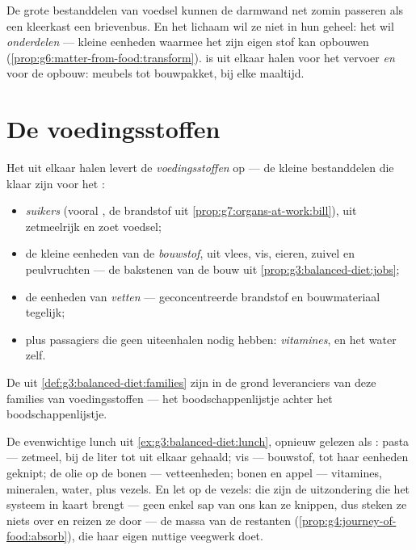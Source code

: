 \begin{remark}\label{rem:g7:digestion-and-nutrients:why}
De grote bestanddelen van voedsel kunnen de darmwand net zomin passeren
als een kleerkast een brievenbus. En het lichaam wil ze niet in hun
geheel: het wil \emph{onderdelen} --- kleine eenheden waarmee het zijn
eigen stof kan opbouwen
(\cref{prop:g6:matter-from-food:transform}).  is uit elkaar halen
voor het vervoer \emph{en} voor de opbouw: meubels tot bouwpakket, bij
elke maaltijd.
\end{remark}

\section{De voedingsstoffen}

\begin{definition}\label{def:g7:digestion-and-nutrients:families}
Het uit elkaar halen levert de
\emph{voedingsstoffen} op --- de kleine bestanddelen
die klaar zijn voor het :
\begin{itemize}
  \item \emph{suikers} (vooral , de brandstof uit
        \cref{prop:g7:organs-at-work:bill}), uit zetmeelrijk en zoet
        voedsel;
  \item de kleine eenheden van de \emph{bouwstof}, uit vlees, vis,
        eieren, zuivel en peulvruchten --- de bakstenen van de bouw uit
        \cref{prop:g3:balanced-diet:jobs};
  \item de eenheden van \emph{vetten} --- geconcentreerde brandstof en
        bouwmateriaal tegelijk;
  \item plus passagiers die geen uiteenhalen nodig hebben:
        \emph{vitamines}, \emph{} en het water zelf.
\end{itemize}
De  uit \cref{def:g3:balanced-diet:families} zijn in de
grond leveranciers van deze families van voedingsstoffen --- het
boodschappenlijstje achter het boodschappenlijstje.
\end{definition}

\begin{example}\label{ex:g7:digestion-and-nutrients:lunch}
De evenwichtige lunch uit \cref{ex:g3:balanced-diet:lunch}, opnieuw
gelezen als : pasta --- zetmeel, bij de liter tot 
uit elkaar gehaald; vis --- bouwstof, tot haar eenheden geknipt; de olie
op de bonen --- vetteenheden; bonen en appel --- vitamines, mineralen,
water, plus vezels. En let op de vezels: die zijn de uitzondering die het
systeem in kaart brengt --- geen enkel sap van ons kan ze knippen, dus
steken ze niets over en reizen ze door --- de massa van de restanten
(\cref{prop:g4:journey-of-food:absorb}), die haar eigen nuttige veegwerk
doet.
\end{example}

